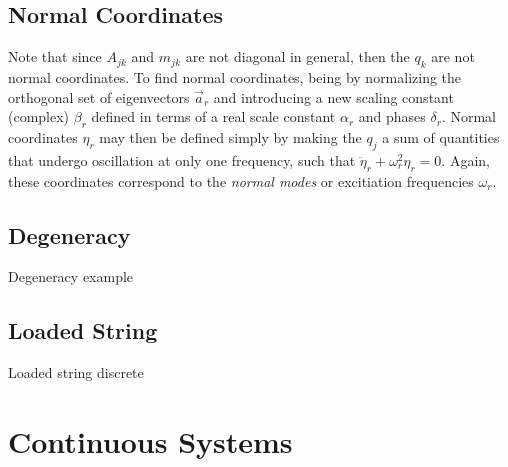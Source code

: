 \subsection{Normal Coordinates}
Note that since $A_{jk}$ and $m_{jk}$ are not diagonal in general, then the $q_k$ are not normal coordinates. To find normal coordinates, being by normalizing the orthogonal set of eigenvectors $\vec{a}_r$ and introducing a new scaling constant (complex) $\beta_r$ defined in terms of a real scale constant $\alpha_r$ and phases $\delta_r$. 
Normal coordinates $\eta_r$ may then be defined simply by making the $q_j$ a sum of quantities that undergo oscillation at only one frequency, such that $\ddot{\eta}_r + \omega_r^2 \eta_r = 0$. Again, these coordinates correspond to the \textit{normal modes} or excitiation frequencies $\omega_r$.

\subsection{Degeneracy}
Degeneracy example

\subsection{Loaded String}
Loaded string discrete




\newpage
\section{Continuous Systems}
\label{sec:cm-continuous}





